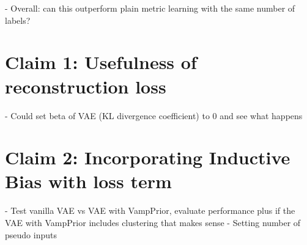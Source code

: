 \documentclass[./dissertation.tex]{subfiles}
\begin{document}
    - Overall: can this outperform plain metric learning with the same number of labels?
    \section{Claim 1: Usefulness of reconstruction loss}
    - Could set beta of VAE (KL divergence coefficient) to 0 and see what happens
    \section{Claim 2: Incorporating Inductive Bias with loss term}
    - Test vanilla VAE vs VAE with VampPrior, evaluate performance plus if the VAE with VampPrior includes clustering that makes sense
    - Setting number of pseudo inputs
    
\end{document}
